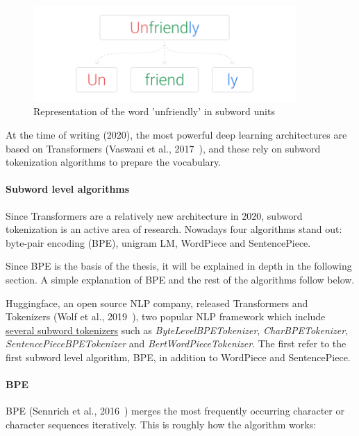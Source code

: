 \begin{figure}[!ht]
    \centering
    \includegraphics[width=10cm]{figures/subword.png}
    \caption{Representation of the word 'unfriendly' in subword units}
\end{figure}

At the time of writing (2020), the most powerful deep learning architectures are based on Transformers (Vaswani et al., 2017~\cite{vaswani2017attention}), and these rely on subword tokenization algorithms to prepare the vocabulary.

\paragraph{Subword level algorithms}

Since Transformers are a relatively new architecture in 2020, subword tokenization is an active area of research. Nowadays four algorithms stand out: byte-pair encoding (BPE), unigram LM, WordPiece and SentencePiece.

Since BPE is the basis of the thesis, it will be explained in depth in the following section. A simple explanation of BPE and the rest of the algorithms follow below.

Huggingface, an open source NLP company, released Transformers and Tokenizers (Wolf et al., 2019~\cite{wolf2019huggingfaces}), two popular NLP framework which include \href{https://github.com/huggingface/tokenizers/tree/74d812d40180032d2dbb6ca59e2e10f0257ef46b/bindings/python/tokenizers/implementations}{several subword tokenizers} such as \emph{ByteLevelBPETokenizer}, \emph{CharBPETokenizer}, \emph{SentencePieceBPETokenizer} and \emph{BertWordPieceTokenizer}. The first refer to the first subword level algorithm, BPE, in addition to WordPiece and SentencePiece.

\paragraph{BPE}\label{subsubsec:bpe}

BPE (Sennrich et al., 2016~\cite{sennrich2015neural}) merges the most frequently occurring character or character sequences iteratively. This is roughly how the algorithm works:

